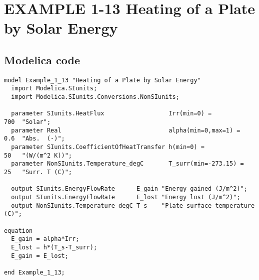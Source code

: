 \documentclass{modelica}
\begin{document}
\thispagestyle{empty}
\date{} %

\section*{EXAMPLE 1-13 Heating of a Plate by Solar Energy}

\subsection*{Modelica code}


\begin{lstlisting}[mathescape=true] 
model Example_1_13 "Heating of a Plate by Solar Energy"
  import Modelica.SIunits;
  import Modelica.SIunits.Conversions.NonSIunits;

  parameter SIunits.HeatFlux                  Irr(min=0) =           700  "Solar";
  parameter Real                              alpha(min=0,max=1) =   0.6  "Abs.  (-)";
  parameter SIunits.CoefficientOfHeatTransfer h(min=0) =             50   "(W/(m^2 K))";
  parameter NonSIunits.Temperature_degC       T_surr(min=-273.15) =  25   "Surr. T (C)";

  output SIunits.EnergyFlowRate      E_gain "Energy gained (J/m^2)";
  output SIunits.EnergyFlowRate      E_lost "Energy lost (J/m^2)";
  output NonSIunits.Temperature_degC T_s    "Plate surface temperature (C)";

equation 
  E_gain = alpha*Irr;
  E_lost = h*(T_s-T_surr);
  E_gain = E_lost;
  
end Example_1_13;  
\end{lstlisting}
\end{document}
